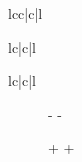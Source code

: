 \begin{table}[htbp]
\begin{tabular}{lcc|c|l}
\begin{enumerate}
\begin{table}[htbp]
\begin{tabular}{lc|c|l}
\begin{table}[htbp]
\begin{tabular}{lc|c|l}
\begin{figure}[htp]
{{-
-\begin{table}[htbp]
+%
+\begin{comment}
+\begin{table}[htbp] 
  \centering
  \caption{Weight parameters ($\lambda_{ij}$) for the individual components of the \LamK correlation functions}
  \renewcommand{\arraystretch}{1.2}
 
- \begin{tabular}{|c|cV{4.0}c|cV{4.0}c|cV{4.0}c|c|}
+ \begin{tabular}{c|cV{4.0}c|cV{4.0}c|cV{4.0}c|c}
   \multicolumn{2}{c}{\LamKchP} & \multicolumn{2}{c}{\ALamKchM} & \multicolumn{2}{c}{\LamKchM} & \multicolumn{2}{c}{\ALamKchP} \\
-  \hline
+  \hlineB{3.0}
   \textbf{Source} & \textbf{$\lambda$ value} & \textbf{Source} & \textbf{$\lambda$ value} & \textbf{Source} & \textbf{$\lambda$ value} & \textbf{Source} & \textbf{$\lambda$ value} \\
   \hlineB{3.0}
   Primary & 0.527 & Primary & 0.526 & Primary & 0.526 & Primary & 0.527 \\
@@ -678,20 +679,60 @@
   \multicolumn{8}{c}{} \\
 

\end{comment}
\end{table}}}
\end{figure}
\end{tabular}
\end{table}
\end{tabular}
\end{table}
\end{enumerate}
\end{tabular}
\end{table}
